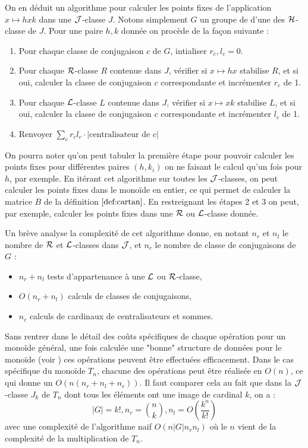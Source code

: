 \documentclass{article}
\begin{document}
	On en déduit un algorithme pour calculer les points fixes de l'application $x \mapsto hxk$ dans une $\mathcal{J}$-classe $J$. Notons simplement $G$ un groupe de \schu d'une des $\mathcal{H}$-classe de $J$. Pour une paire $h, k$ donnée on procède de la façon suivante :
	\begin{enumerate}
		\item Pour chaque classe de conjugaison $c$ de $G$, intialiser $r_c, l_c = 0$.
		\item Pour chaque $\mathcal{R}$-classe $R$ contenue dans $J$, vérifier si $x \mapsto hx$ stabilise $R$, et si oui, calculer la classe de conjugaison $c$ correspondante et incrémenter $r_c$ de 1.
		\item Pour chaque $\mathcal{L}$-classe $L$ contenue dans $J$, vérifier si $x \mapsto xk$ stabilise $L$, et si oui, calculer la classe de conjugaison $c$ correspondante et incrémenter $l_c$ de 1.
		\item Renvoyer $\sum_c r_cl_c\cdot |\textrm{centralisateur de }c|$
	\end{enumerate} 

	On pourra noter qu'on peut tabuler la première étape pour pouvoir calculer les points fixes pour différentes paires $(h, k_i)$ on ne faisant le calcul qu'un fois pour $h$, par exemple. En itérant cet algorithme sur toutes les $\mathcal{J}$-classes, on peut calculer les points fixes dans le monoïde en entier, ce qui permet de calculer la matrice $B$ de la définition $\ref{def:cartan}$. En restreignant les étapes 2 et 3 on peut, par exemple, calculer les points fixes dans une $\mathcal{R}$ ou $\mathcal{L}$-classe donnée.
	
	Un brève analyse la complexité de cet algorithme donne, en notant $n_r$ et $n_l$ le nombre de $\mathcal{R}$ et $\mathcal{L}$-classes dans $\mathcal{J}$, et $n_c$ le nombre de classe de conjugaisons de $G$ :
	\begin{itemize}
		\item $n_r + n_l$ tests d'appartenance à une $\mathcal{L}$ ou $\mathcal{R}$-classe,
		\item $O(n_r + n_l)$ calculs de classes de conjugaisons,
		\item $n_c$ calculs de cardinaux de centralisateurs et sommes.
	\end{itemize}
	Sans rentrer dans le détail des coûts spécifiques de chaque opération pour un monoïde général, une fois calculée une "bonne" structure de données pour le monoïde (voir \cite{east2019computing}) ces opérations peuvent être effectuées efficacement. Dans le cas spécifique du monoïde $T_n$, chacune des opérations peut être réalisée en $O(n)$, ce qui donne un $O(n(n_r+n_l+n_c))$.
	Il faut comparer cela au fait que dans la $\mathcal{J}$-classe $J_k$ de $T_n$ dont tous les éléments ont une image de cardinal $k$, on a :
	\[|G| = k!, n_r = {n \choose k}, n_l = O\left(\frac{k^n}{k!}\right)\]
	avec une complexité de l'algorithme naif $O(n|G|n_rn_l)$ où le $n$ vient de la complexité de la multiplication de $T_n$.
	
\end{document}
